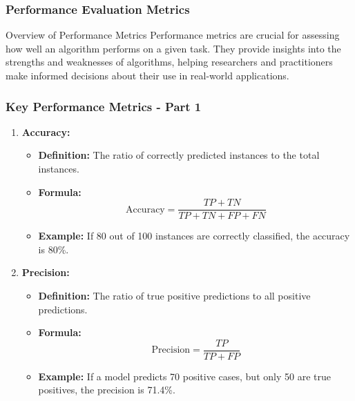 \documentclass[aspectratio=169]{beamer}
\begin{document}
\begin{frame}[fragile]
    \frametitle{Performance Evaluation Metrics}
    \begin{block}{Overview of Performance Metrics}
        Performance metrics are crucial for assessing how well an algorithm performs on a given task. They provide insights into the strengths and weaknesses of algorithms, helping researchers and practitioners make informed decisions about their use in real-world applications.
    \end{block}
\end{frame}

\begin{frame}[fragile]
    \frametitle{Key Performance Metrics - Part 1}
    \begin{enumerate}
        \item \textbf{Accuracy:}
            \begin{itemize}
                \item \textbf{Definition:} The ratio of correctly predicted instances to the total instances.
                \item \textbf{Formula:} 
                \begin{equation}
                    \text{Accuracy} = \frac{TP + TN}{TP + TN + FP + FN}
                \end{equation}
                \item \textbf{Example:} If 80 out of 100 instances are correctly classified, the accuracy is 80\%.
            \end{itemize}

        \item \textbf{Precision:}
            \begin{itemize}
                \item \textbf{Definition:} The ratio of true positive predictions to all positive predictions.
                \item \textbf{Formula:}
                \begin{equation}
                    \text{Precision} = \frac{TP}{TP + FP}
                \end{equation}
                \item \textbf{Example:} If a model predicts 70 positive cases, but only 50 are true positives, the precision is 71.4\%.
            \end{itemize}
    \end{enumerate}
\end{frame}
\end{document}
